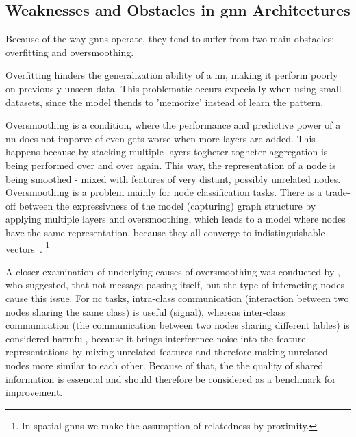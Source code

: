 \subsection{Weaknesses and Obstacles in \ac{gnn} Architectures}
\label{sec:related:pred:typical}
Because of the way \acp{gnn} operate, they tend to suffer from two main obstacles:
overfitting and oversmoothing.

Overfitting hinders the generalization ability of a \acf{nn}, making it perform poorly
on previously unseen data. This problematic occurs expecially when using small datasets,
since the model thends to 'memorize' instead of learn the pattern.

Oversmoothing is a condition, where the performance and predictive power of a \ac{nn}
does not imporve of even gets worse when more layers are added. This happens because
by stacking multiple layers  togheter togheter aggregation is being performed over and over again.
This way, the representation of a node is being smoothed - mixed with features of
very distant, possibly unrelated nodes. Oversmoothing is a problem mainly for node classification tasks. There is a trade-off between the expressivness of the model (capturing) graph structure by applying multiple layers and oversmoothing, which leads
to a model where nodes have the same representation,
because they all converge to indistinguishable vectors~\cite{Zhou2020,Hasanzadeh2020}.%
\footnote{In spatial \acp{gnn} we make the assumption of relatedness by proximity.}

A closer examination of underlying causes of oversmoothing was conducted by \citet{Chen2020}, who suggested, that not message passing itself, but the type of interacting nodes cause this issue.
For \acf{nc} tasks, intra-class communication (interaction between two nodes sharing the same class) is useful (signal), whereas inter-class communication (the communication between two nodes sharing different lables) is considered harmful, because it brings interference noise into the feature-representations by mixing unrelated features and therefore making unrelated nodes more similar to each other. Because of that, the the quality of shared information is essencial and should therefore be considered as a benchmark for improvement.



